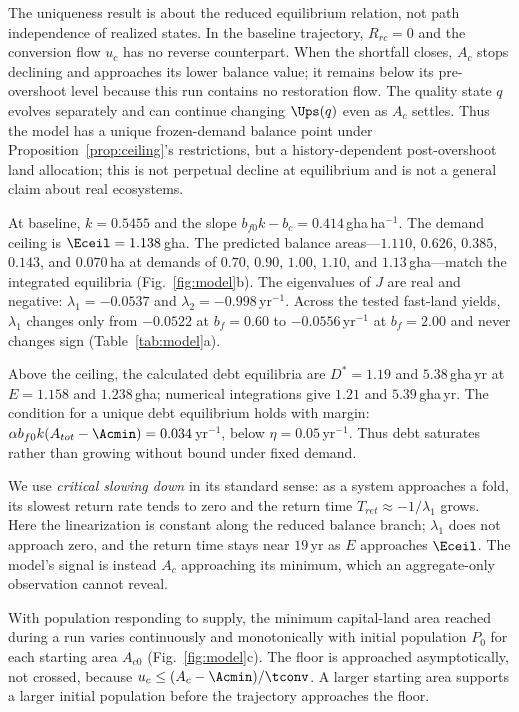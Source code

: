 The uniqueness result is about the reduced equilibrium relation, not path independence of realized states. In the baseline trajectory, $R_{rc}=0$ and the conversion flow $u_c$ has no reverse counterpart. When the shortfall closes, $A_c$ stops declining and approaches its lower balance value; it remains below its pre-overshoot level because this run contains no restoration flow. The quality state $q$ evolves separately and can continue changing $\Ups(q)$ even as $A_c$ settles. Thus the model has a unique frozen-demand balance point under Proposition~\ref{prop:ceiling}'s restrictions, but a history-dependent post-overshoot land allocation; this is not perpetual decline at equilibrium and is not a general claim about real ecosystems.

At baseline, $k=0.5455$ and the slope $b_{f0}k-b_c=0.414$\,gha\,ha$^{-1}$. The demand ceiling is $\Eceil=1.138$\,gha. The predicted balance areas—$1.110$, $0.626$, $0.385$, $0.143$, and $0.070$\,ha at demands of $0.70$, $0.90$, $1.00$, $1.10$, and $1.13$\,gha—match the integrated equilibria (Fig.~\ref{fig:model}b). The eigenvalues of $J$ are real and negative: $\lambda_1=-0.0537$ and $\lambda_2=-0.998$\,yr$^{-1}$. Across the tested fast-land yields, $\lambda_1$ changes only from $-0.0522$ at $b_f=0.60$ to $-0.0556$\,yr$^{-1}$ at $b_f=2.00$ and never changes sign (Table~\ref{tab:model}a).

Above the ceiling, the calculated debt equilibria are $D^*=1.19$ and $5.38$\,gha\,yr at $E=1.158$ and $1.238$\,gha; numerical integrations give $1.21$ and $5.39$\,gha\,yr. The condition for a unique debt equilibrium holds with margin: $\alpha b_{f0}k(A_{tot}-\Acmin)=0.034$\,yr$^{-1}$, below $\eta=0.05$\,yr$^{-1}$. Thus debt saturates rather than growing without bound under fixed demand.

We use \emph{critical slowing down} in its standard sense: as a system approaches a fold, its slowest return rate tends to zero and the return time $T_{ret}\approx-1/\lambda_1$ grows. Here the linearization is constant along the reduced balance branch; $\lambda_1$ does not approach zero, and the return time stays near $19$\,yr as $E$ approaches $\Eceil$. The model's signal is instead $A_c$ approaching its minimum, which an aggregate-only observation cannot reveal.

With population responding to supply, the minimum capital-land area reached during a run varies continuously and monotonically with initial population $P_0$ for each starting area $A_{c0}$ (Fig.~\ref{fig:model}c). The floor is approached asymptotically, not crossed, because $u_c\le(A_c-\Acmin)/\tconv$. A larger starting area supports a larger initial population before the trajectory approaches the floor.

